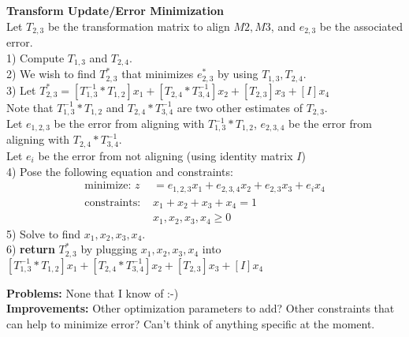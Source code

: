 \documentclass{article}
\begin{document}
	\begin{algorithm}
	\DontPrintSemicolon
	\textbf{Transform Update/Error Minimization}\\
	Let $T_{2,3}$ be the transformation matrix to align $M2, M3$, and $e_{2,3}$ be the associated error.\\
	1) Compute $T_{1,3}$ and $T_{2,4}$.\\
	2) We wish to find $T_{2,3}^{*}$ that minimizes $e_{2,3}^{*}$ by using $T_{1,3},T_{2,4}$.\\
	3) Let $T_{2,3}^{*} = [T_{1,3}^{-1}*T_{1,2}]x_1 + [T_{2,4}*T_{3,4}^{-1}]x_2 + [T_{2,3}]x_3 + [I]x_4$\\
	Note that $T_{1,3}^{-1}*T_{1,2}$ and $T_{2,4}*T_{3,4}^{-1}$ are two other estimates of $T_{2,3}$.\\
	Let $e_{1,2,3}$ be the error from aligning with $T_{1,3}^{-1}*T_{1,2}$, $e_{2,3,4}$ be the error from aligning with $T_{2,4}*T_{3,4}^{-1}$.\\
	Let $e_i$ be the error from not aligning (using identity matrix $I$) \\
 	4) Pose the following equation and constraints:
	\begin{align*}
	 \text{minimize: } z &= e_{1,2,3}x_1 +  e_{2,3,4}x_2 + e_{2,3}x_3 + e_ix_4\\
	 \text{constraints: }&x_1 + x_2 + x_3 + x_4 = 1\\
	 &x_1, x_2, x_3, x_4 \ge 0
	\end{align*}
	5) Solve to find $x_1, x_2, x_3, x_4$.\\
	6) \textbf{return} $T_{2,3}^{*}$ by plugging $x_1, x_2, x_3, x_4$ into $[T_{1,3}^{-1}*T_{1,2}]x_1 + [T_{2,4}*T_{3,4}^{-1}]x_2 + [T_{2,3}]x_3 + [I]x_4$
	\end{algorithm}
	
\textbf{Problems:} None that I know of :-)\\
\textbf{Improvements:} Other optimization parameters to add? Other constraints that can help to minimize error? Can't think of anything specific at the moment.
\end{document}
